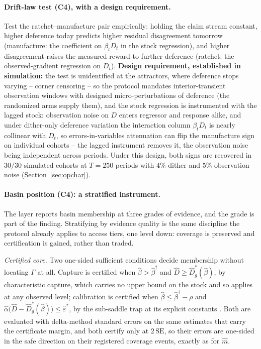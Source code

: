 \documentclass[11pt]{article}
\theoremstyle{definition}
\theoremstyle{remark}
\numberwithin{equation}{section}
\begin{document}
\paragraph{Drift-law test (C4), with a design requirement.} Test the ratchet--manufacture pair empirically: holding the claim stream constant, higher deference today predicts higher residual disagreement tomorrow (manufacture: the coefficient on $\beta_t D_t$ in the stock regression), and higher disagreement raises the measured reward to further deference (ratchet: the observed-gradient regression on $D_t$). \textbf{Design requirement, established in simulation:} the test is unidentified at the attractors, where deference stops varying -- corner censoring -- so the protocol mandates interior-transient observation windows with designed micro-perturbations of deference (the randomized arms supply them), and the stock regression is instrumented with the lagged stock: observation noise on $D$ enters regressor and response alike, and under dither-only deference variation the interaction column $\beta_t D_t$ is nearly collinear with $D_t$, so errors-in-variables attenuation can flip the manufacture sign on individual cohorts -- the lagged instrument removes it, the observation noise being independent across periods. Under this design, both signs are recovered in $30/30$ simulated cohorts at $T = 250$ periods with $4\%$ dither and $5\%$ observation noise (Section~\ref{sec:opchar}).

\paragraph{Basin position (C4): a stratified instrument.} The layer reports basin membership at three grades of evidence, and the grade is part of the finding. Stratifying by evidence quality is the same discipline the protocol already applies to access tiers, one level down: coverage is preserved and certification is gained, rather than traded.

\emph{Certified core.} Two one-sided sufficient conditions decide membership without locating $\Gamma$ at all. Capture is certified when $\hat\beta > \hat\beta^\dagger$ and $\hat D \ge \hat D^\ast_g(\hat\beta)$, by characteristic capture, which carries no upper bound on the stock and so applies at any observed level; calibration is certified when $\hat\beta \le \hat\beta^\dagger-\rho$ and $\hat\alpha\bigl(\hat D-\hat D^\ast_g(\hat\beta)\bigr) \le \hat\varepsilon^\ast$, by the sub-saddle trap at its explicit constants \citep{hofheinz2026loops}. Both are evaluated with delta-method standard errors on the same estimates that carry the certificate margin, and both certify only at $2\,\mathrm{SE}$, so their errors are one-sided in the safe direction on their registered coverage events, exactly as for $\hat m$.
\end{document}
